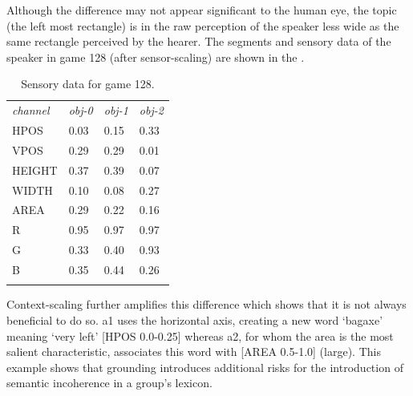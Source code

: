 Although the difference may not appear significant to 
the human eye, the topic (the left most rectangle) is 
in the raw perception of the speaker less wide as the same 
rectangle perceived by the hearer. 
The segments and sensory data of the speaker
in game 128 (after sensor-scaling) are shown in the 
. 

\begin{table}
\begin{center}
\begin{tabular}{ l  l  l  l }
\lsptoprule
{\itshape channel}& {\itshape obj-0} & {\itshape obj-1} & {\itshape obj-2}\\ 
HPOS & 0.03 & 0.15 & 0.33\\ 
VPOS & 0.29 & 0.29 & 0.01\\ 
HEIGHT & 0.37 & 0.39 & 0.07\\ 
WIDTH & 0.10 & 0.08 & 0.27\\ 
AREA & 0.29 & 0.22 & 0.16\\ 
R & 0.95 & 0.97 & 0.97 \\ 
G & 0.33 & 0.40 & 0.93\\ 
B & 0.35 & 0.44 & 0.26\\ 
\lspbottomrule
\end{tabular}
\caption{ \label{tab:game128} Sensory data for game 128.}
\end{center}
\end{table}
Context-scaling further
amplifies this difference which shows that it is not 
always beneficial to do so. {\bfshape a1} uses
the horizontal axis, creating a new word `bagaxe' 
meaning `very left' [HPOS 0.0-0.25] whereas {\bfshape a2}, for
whom the area is the most salient characteristic, 
associates this word with [AREA 0.5-1.0] (large). 
This example shows that grounding introduces 
additional risks for the introduction of semantic
incoherence in a group's lexicon. 

